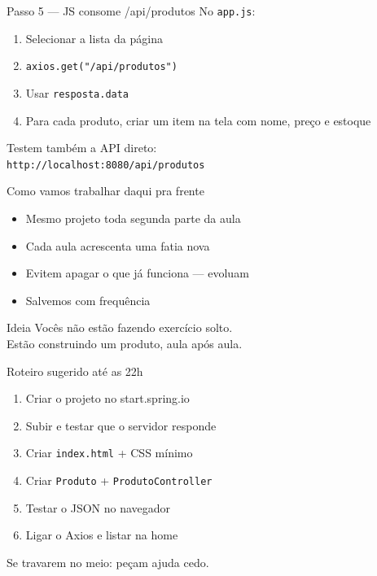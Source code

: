 \documentclass[aspectratio=169,11pt]{beamer}
\begin{document}
\begin{frame}{Passo 5 --- JS consome /api/produtos}
  No \texttt{app.js}:
  \begin{enumerate}
    \item Selecionar a lista da página
    \item \texttt{axios.get("/api/produtos")}
    \item Usar \texttt{resposta.data}
    \item Para cada produto, criar um item na tela
          com nome, preço e estoque
  \end{enumerate}

  \vspace{0.6em}
  Testem também a API direto:\\
  \texttt{http://localhost:8080/api/produtos}
\end{frame}

\begin{frame}{Como vamos trabalhar daqui pra frente}
  \begin{itemize}
    \item Mesmo projeto toda segunda parte da aula
    \item Cada aula acrescenta uma fatia nova
    \item Evitem apagar o que já funciona --- evoluam
    \item Salvemos com frequência
  \end{itemize}

  \vspace{0.7em}
  \begin{block}{Ideia}
    Vocês não estão fazendo exercício solto.\\
    Estão construindo um produto, aula após aula.
  \end{block}
\end{frame}

\begin{frame}{Roteiro sugerido até as 22h}
  \begin{enumerate}
    \item Criar o projeto no start.spring.io
    \item Subir e testar que o servidor responde
    \item Criar \texttt{index.html} + CSS mínimo
    \item Criar \texttt{Produto} + \texttt{ProdutoController}
    \item Testar o JSON no navegador
    \item Ligar o Axios e listar na home
  \end{enumerate}

  \vspace{0.5em}
  Se travarem no meio: peçam ajuda cedo.
\end{frame}
\end{document}

